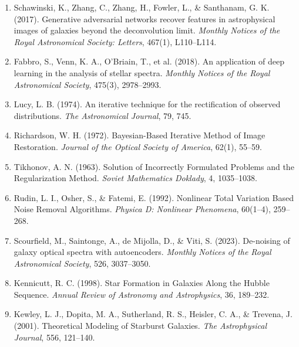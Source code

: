 \documentclass[12pt]{article}
\begin{document}
\begin{enumerate}
\item Schawinski, K., Zhang, C., Zhang, H., Fowler, L., \& Santhanam, G. K. (2017). Generative adversarial networks recover features in astrophysical images of galaxies beyond the deconvolution limit. \textit{Monthly Notices of the Royal Astronomical Society: Letters}, 467(1), L110--L114.

\item Fabbro, S., Venn, K. A., O'Briain, T., et al. (2018). An application of deep learning in the analysis of stellar spectra. \textit{Monthly Notices of the Royal Astronomical Society}, 475(3), 2978--2993.

\item Lucy, L. B. (1974). An iterative technique for the rectification of observed distributions. \textit{The Astronomical Journal}, 79, 745.

\item Richardson, W. H. (1972). Bayesian-Based Iterative Method of Image Restoration. \textit{Journal of the Optical Society of America}, 62(1), 55--59.

\item Tikhonov, A. N. (1963). Solution of Incorrectly Formulated Problems and the Regularization Method. \textit{Soviet Mathematics Doklady}, 4, 1035--1038.

\item Rudin, L. I., Osher, S., \& Fatemi, E. (1992). Nonlinear Total Variation Based Noise Removal Algorithms. \textit{Physica D: Nonlinear Phenomena}, 60(1--4), 259--268.

\item Scourfield, M., Saintonge, A., de Mijolla, D., \& Viti, S. (2023). De-noising of galaxy optical spectra with autoencoders. \textit{Monthly Notices of the Royal Astronomical Society}, 526, 3037--3050.

\item Kennicutt, R. C. (1998). Star Formation in Galaxies Along the Hubble Sequence. \textit{Annual Review of Astronomy and Astrophysics}, 36, 189--232.

\item Kewley, L. J., Dopita, M. A., Sutherland, R. S., Heisler, C. A., \& Trevena, J. (2001). Theoretical Modeling of Starburst Galaxies. \textit{The Astrophysical Journal}, 556, 121--140.

\end{enumerate}
\end{document}
